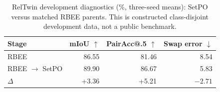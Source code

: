 \begin{table}[t]
\centering
\caption{RelTwin development diagnostics (\%, three-seed means): SetPO versus matched RBEE parents. This is constructed class-disjoint development data, not a public benchmark.}
\label{tab:relations}
\small
\setlength{\tabcolsep}{5pt}
\begin{tabular}{@{}lrrr@{}}
\toprule
Stage & mIoU $\uparrow$ & PairAcc@.5 $\uparrow$ & Swap error $\downarrow$\\
\midrule
RBEE & 86.55 & 81.46 & 8.54\\
RBEE $\to$ SetPO & 89.90 & 86.67 & 5.83\\
$\Delta$ & +3.36 & +5.21 & $-2.71$\\
\bottomrule
\end{tabular}
\end{table}

